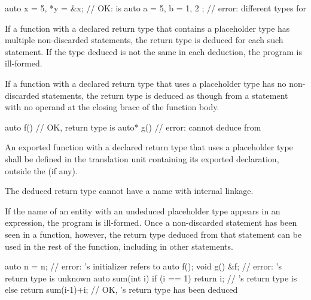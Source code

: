 \begin{example}
\begin{codeblock}
auto x = 5, *y = &x;            // OK:  is 
auto a = 5, b = { 1, 2 };       // error: different types for 
\end{codeblock}
\end{example}

\pnum
If a function with a declared return type that contains a placeholder type has
multiple non-discarded  statements, the return type is deduced for each
such  statement. If the type deduced is not the same in each
deduction, the program is ill-formed.

\pnum
If a function with a declared return type that uses a placeholder type has no
non-discarded  statements, the return type is deduced as though from a
 statement with no operand at the closing brace of the function
body.
\begin{example}
\begin{codeblock}
auto  f() { }                   // OK, return type is 
auto* g() { }                   // error: cannot deduce  from 
\end{codeblock}
\end{example}

\pnum
An exported function
with a declared return type that uses a placeholder type
shall be defined in the translation unit
containing its exported declaration,
outside the  (if any).
\begin{note}
The deduced return type cannot have
a name with internal linkage.
\end{note}

\pnum
If the name of an entity with an undeduced placeholder type appears in an
expression, the program is ill-formed.  Once a
non-discarded  statement has been seen in a function, however, the return type deduced
from that statement can be used in the rest of the function, including in other
 statements.
\begin{example}
\begin{codeblock}
auto n = n;                     // error: 's initializer refers to 
auto f();
void g() { &f; }                // error: 's return type is unknown
auto sum(int i) {
  if (i == 1)
    return i;                   // 's return type is 
  else
    return sum(i-1)+i;          // OK, 's return type has been deduced
}
\end{codeblock}
\end{example}

